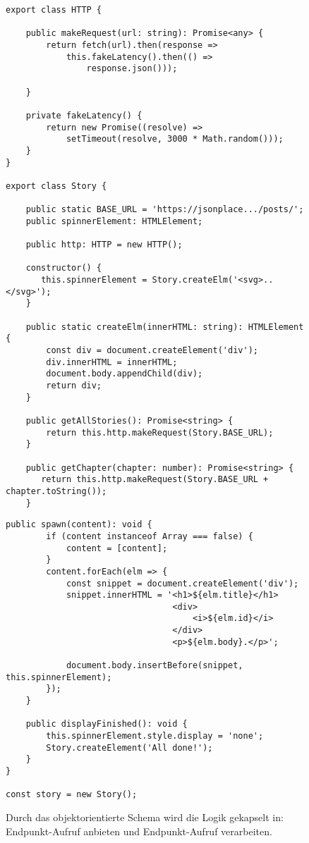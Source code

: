 \begin{figure}[H]
\begin{lstlisting}[basicstyle=\small]
export class HTTP {

    public makeRequest(url: string): Promise<any> {
        return fetch(url).then(response =>
            this.fakeLatency().then(() =>
                response.json()));

    }

    private fakeLatency() {
        return new Promise((resolve) =>
            setTimeout(resolve, 3000 * Math.random()));
    }
}

export class Story {

    public static BASE_URL = 'https://jsonplace.../posts/';
    public spinnerElement: HTMLElement;

    public http: HTTP = new HTTP();

    constructor() {
       this.spinnerElement = Story.createElm('<svg>..</svg>');
    }

    public static createElm(innerHTML: string): HTMLElement {
        const div = document.createElement('div');
        div.innerHTML = innerHTML;
        document.body.appendChild(div);
        return div;
    }
    
    public getAllStories(): Promise<string> {
        return this.http.makeRequest(Story.BASE_URL);
    }

    public getChapter(chapter: number): Promise<string> {
       return this.http.makeRequest(Story.BASE_URL + chapter.toString());
    }
\end{lstlisting}
\end{figure}

\begin{figure}[H]\ContinuedFloat
\begin{lstlisting}[basicstyle=\small]
    public spawn(content): void {
        if (content instanceof Array === false) {
            content = [content];
        }
        content.forEach(elm => {
            const snippet = document.createElement('div');
            snippet.innerHTML = '<h1>${elm.title}</h1>
                                 <div>
                                     <i>${elm.id}</i>
                                 </div>
                                 <p>${elm.body}.</p>';

            document.body.insertBefore(snippet, this.spinnerElement);
        });
    }
    
    public displayFinished(): void {
        this.spinnerElement.style.display = 'none';
        Story.createElement('All done!');
    }
}

const story = new Story();
\end{lstlisting}
\caption{Durch das objektorientierte Schema wird die Logik gekapselt in: Endpunkt-Aufruf anbieten und Endpunkt-Aufruf verarbeiten.}
\end{figure}

